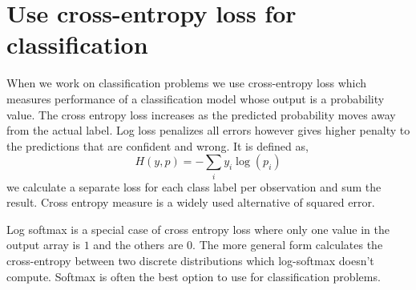 {\centering{}\par}

\section{Use cross-entropy loss for classification}
When we work on classification problems we use cross-entropy loss which measures performance of a classification model whose output is a probability value. 
The cross entropy loss increases as the predicted probability moves away from the actual label. 
Log loss penalizes all errors however gives higher penalty to the predictions that are confident and wrong. 
It is defined as,
\begin{equation}
H(y, p)=-\sum_i y_i \log(p_i)
\end{equation}
we calculate a separate loss for each class label per observation and sum the result. 
Cross entropy measure is a widely used alternative of squared error.

Log softmax is a special case of cross entropy loss where only one value in the output array is $1$ and the others are $0$. 
The more general form calculates the cross-entropy between two discrete distributions which log-softmax doesn’t compute. 
Softmax is often the best option to use for classification problems. 

{\centering{}\par}
\vspace{5pt}


